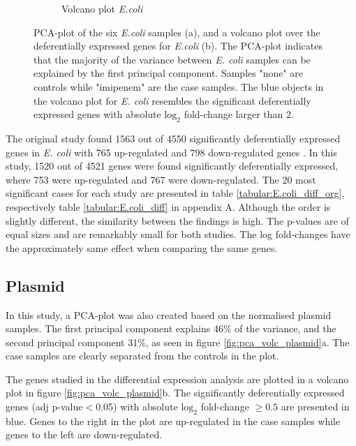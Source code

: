\begin{figure}[ht]
\begin{subfigure}{0.47\textwidth}
        \caption{Volcano plot \textit{E.coli}}
    \end{subfigure}
    \caption{PCA-plot of the six \textit{E.coli} samples (a), and a volcano plot over the deferentially expressed genes for \textit{E.coli} (b). The PCA-plot indicates that the majority of the variance between \textit{E. coli} samples can be explained by the first principal component. Samples "none" are controls while "imipenem" are the case samples. The blue objects in the volcano plot for \textit{E. coli} resembles the significant deferentially expressed genes with absolute $\mathrm{log}_2$ fold-change larger than $2$.}
    \label{fig:pca_volc_E_coli}
\end{figure}

The original study found 1563 out of 4550 significantly deferentially expressed genes in \textit{E. coli} with 765 up-regulated and 798 down-regulated genes \cite{jousset2018transcriptional}. In this study, 1520 out of 4521 genes were found significantly deferentially expressed, where 753 were up-regulated and 767 were down-regulated. The 20 most significant cases for each study are presented in table \ref{tabular:E.coli_diff_org}, respectively table \ref{tabular:E.coli_diff} in appendix A. Although the order is slightly different, the similarity between the findings is high. The p-values are of equal sizes and are remarkably small for both studies. The log fold-changes have the approximately same effect when comparing the same genes.



\subsection{Plasmid}
 In this study, a PCA-plot was also created based on the normalised plasmid samples. The first principal component explains 46\% of the variance, and the second principal component 31\%, as seen in figure \ref{fig:pca_volc_plasmid}a. The case samples are clearly separated from the controls in the plot. 

The genes studied in the differential expression analysis are plotted in a volcano plot in figure \ref{fig:pca_volc_plasmid}b. The significantly deferentially expressed genes (adj p-value$<$0.05) with absolute $\mathrm{log}_2$ fold-change $\geq 0.5$ are presented in blue. Genes to the right in the plot are up-regulated in the case samples while genes to the left are down-regulated.

